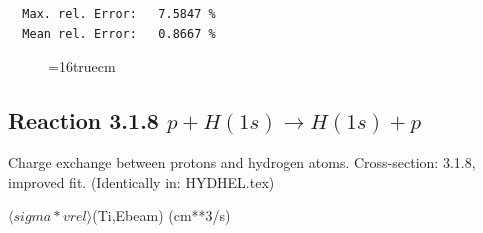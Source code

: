 \documentclass[12pt,dvipdfmx]{article}
\begin{document}
\begin{small}
\begin{verbatim}
  Max. rel. Error:   7.5847 %
  Mean rel. Error:   0.8667 %

\end{verbatim}\end{small}


\begin{figure} \label{2.3.9H3}
\epsfxsize=16truecm
\end{figure}
\newpage
\subsection{
Reaction 3.1.8  $ p + H(1s) \rightarrow H(1s) + p   $
}

 Charge exchange between protons and hydrogen
 atoms. Cross-section:  3.1.8, improved fit. (Identically in: HYDHEL.tex)

$  \langle sigma*vrel \rangle$(Ti,Ebeam)  (cm**3/s)
\end{document}
